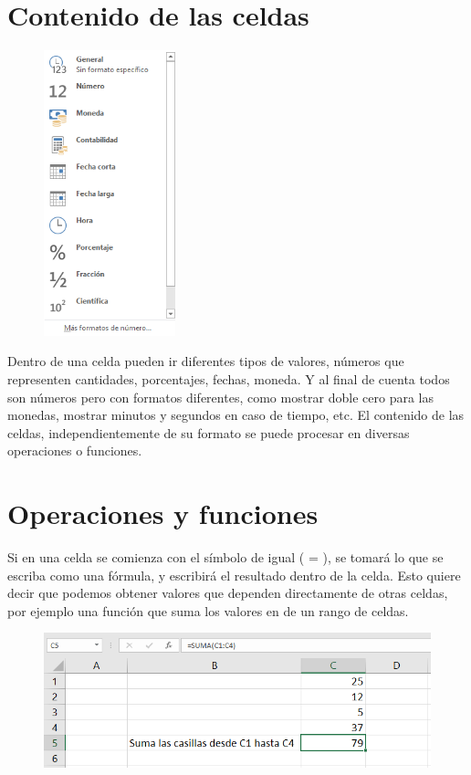\documentclass[12pt,a4paper]{book}
\begin{document}
\section{Contenido de las celdas}
\begin{figure}
    \centering
    \includegraphics[width=3.8cm]{excel5}
\end{figure}

Dentro de una celda pueden ir diferentes tipos de valores, números que representen cantidades, porcentajes, fechas, moneda. Y al final de cuenta todos son números pero con formatos diferentes, como mostrar doble cero para las monedas, mostrar minutos y segundos en caso de tiempo, etc.
El contenido de las celdas, independientemente de su formato se puede procesar en diversas operaciones o funciones. 
\\
\section{Operaciones y funciones}
Si en una celda se comienza con el símbolo de igual ( = ), se tomará lo que se escriba como una fórmula, y escribirá el resultado dentro de la celda. Esto quiere decir que podemos obtener valores que dependen directamente de otras celdas, por ejemplo una función que suma los valores en de un rango de celdas.
\begin{figure}[h]
	\centering
    \includegraphics[width=13cm]{excel6}
\end{figure}
\clearpage
\end{document}
